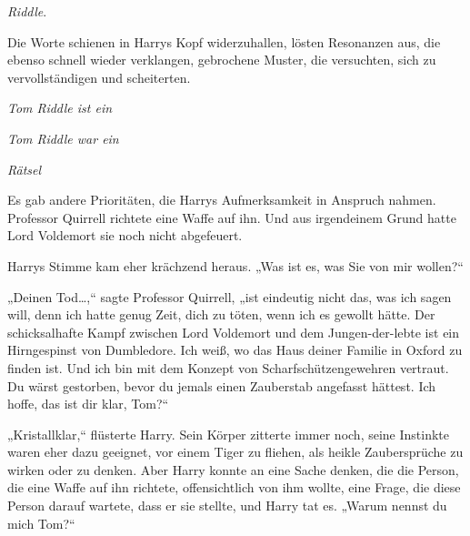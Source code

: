 
 \emph{Riddle}.

\hplettrineextrapara
Die Worte schienen in Harrys Kopf widerzuhallen, lösten Resonanzen aus, die ebenso schnell wieder verklangen, gebrochene Muster, die versuchten, sich zu vervollständigen und scheiterten.

\emph{Tom Riddle ist ein}

\emph{Tom Riddle war ein}

\emph{Rätsel}

Es gab andere Prioritäten, die Harrys Aufmerksamkeit in Anspruch nahmen.
Professor Quirrell richtete eine Waffe auf ihn.
Und aus irgendeinem Grund hatte Lord Voldemort sie noch nicht abgefeuert.

Harrys Stimme kam eher krächzend heraus.
„Was ist es, was Sie von mir wollen?“

„Deinen Tod…,“ sagte Professor Quirrell, „ist eindeutig nicht das, was ich sagen will, denn ich hatte genug Zeit, dich zu töten, wenn ich es gewollt hätte. Der schicksalhafte Kampf zwischen Lord Voldemort und dem Jungen-der-lebte ist ein Hirngespinst von Dumbledore. Ich weiß, wo das Haus deiner Familie in Oxford zu finden ist. Und ich bin mit dem Konzept von Scharfschützengewehren vertraut. Du wärst gestorben, bevor du jemals einen Zauberstab angefasst hättest. Ich hoffe, das ist dir klar, Tom?“

„Kristallklar,“ flüsterte Harry.
Sein Körper zitterte immer noch, seine Instinkte waren eher dazu geeignet, vor einem Tiger zu fliehen, als heikle Zaubersprüche zu wirken oder zu denken. Aber Harry konnte an eine Sache denken, die die Person, die eine Waffe auf ihn richtete, offensichtlich von ihm wollte, eine Frage, die diese Person darauf wartete, dass er sie stellte, und Harry tat es.
„Warum nennst du mich Tom?“

